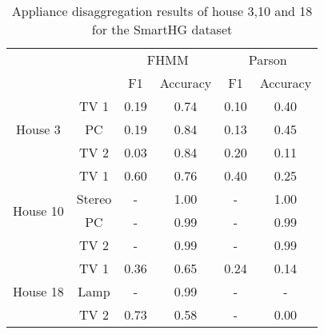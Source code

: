 \begin{table}[H]                             
\centering                                   
\begin{tabular}{cc|c|c|c|c|}
\cline{3-6}
\multicolumn{1}{l}{}                            &        & \multicolumn{2}{c|}{FHMM} & \multicolumn{2}{c|}{Parson} \\ \cline{3-6} 
\multicolumn{1}{l}{}                            &        & F1        & Accuracy      & F1         & Accuracy       \\ \hline
\multicolumn{1}{|c|}{\multirow{3}{*}{House 3}}  & TV 1   & 0.19      & 0.74          & 0.10       & 0.40           \\ \cline{2-6} 
\multicolumn{1}{|c|}{}                          & PC     & 0.19      & 0.84          & 0.13       & 0.45           \\ \cline{2-6} 
\multicolumn{1}{|c|}{}                          & TV 2   & 0.03      & 0.84          & 0.20       & 0.11           \\ \hline
\multicolumn{1}{|c|}{\multirow{4}{*}{House 10}} & TV 1   & 0.60      & 0.76          & 0.40       & 0.25           \\ \cline{2-6} 
\multicolumn{1}{|c|}{}                          & Stereo & -         & 1.00          & -          & 1.00           \\ \cline{2-6} 
\multicolumn{1}{|c|}{}                          & PC     & -         & 0.99          & -          & 0.99           \\ \cline{2-6} 
\multicolumn{1}{|c|}{}                          & TV 2   & -         & 0.99          & -          & 0.99           \\ \hline
\multicolumn{1}{|c|}{\multirow{3}{*}{House 18}} & TV 1   & 0.36      & 0.65          & 0.24       & 0.14           \\ \cline{2-6} 
\multicolumn{1}{|c|}{}                          & Lamp   & -         & 0.99          & -          & -              \\ \cline{2-6} 
\multicolumn{1}{|c|}{}                          & TV 2   & 0.73      & 0.58          & -          & 0.00           \\ \hline
\end{tabular}                               
\caption{Appliance disaggregation results of house 3,10 and 18 for the SmartHG dataset}                     
\label{table:Tab:SHGREAL}                    
\end{table}  